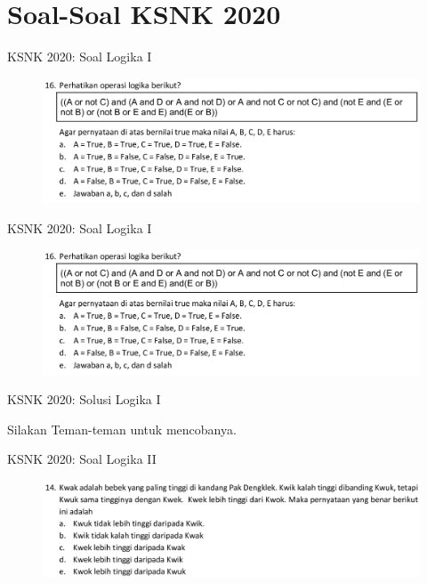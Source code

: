 \documentclass[english,t]{beamer}
\begin{document}
\section{Soal-Soal KSNK 2020}
\begin{frame}{KSNK 2020: Soal Logika I}
	\begin{figure}[!ht]
		\centering
		\includegraphics[scale=.19]{images/soal-ksnk-2020-no-16-logika}
	\end{figure}
\end{frame}

\begin{frame}{KSNK 2020: Soal Logika I}
	\begin{figure}[!ht]
		\centering
		\includegraphics[scale=.19]{images/soal-ksnk-2020-no-16-logika}
	\end{figure}
\end{frame}

\begin{frame}{KSNK 2020: Solusi Logika I}
	\begin{center}
		Silakan Teman-teman untuk mencobanya.
	\end{center}
\end{frame}

\begin{frame}{KSNK 2020: Soal Logika II}
	\begin{figure}[!ht]
		\centering
		\includegraphics[scale=.19]{images/soal-ksnk-2020-no-14-logika}
	\end{figure}
\end{frame}
\end{document}
